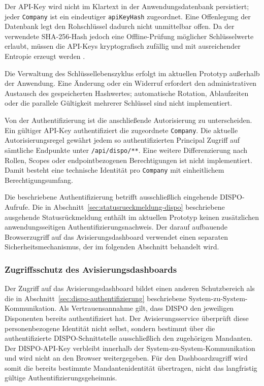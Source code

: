 \documentclass[
  12pt,
  a4paper,
  oneside
]{article}
\begin{document}
Der API-Key wird nicht im Klartext in der Anwendungsdatenbank persistiert;
jeder \texttt{Company} ist ein eindeutiger \texttt{apiKeyHash} zugeordnet. Eine
Offenlegung der Datenbank legt den Rohschlüssel dadurch nicht unmittelbar
offen. Da der verwendete SHA-256-Hash jedoch eine Offline-Prüfung möglicher
Schlüsselwerte erlaubt, müssen die API-Keys kryptografisch zufällig und mit
ausreichender Entropie erzeugt werden
\parencite{owaspSecretsManagement}.

Die Verwaltung des Schlüssellebenszyklus erfolgt im aktuellen Prototyp
außerhalb der Anwendung. Eine Änderung oder ein Widerruf erfordert den
administrativen Austausch des gespeicherten Hashwertes; automatische Rotation,
Ablaufzeiten oder die parallele Gültigkeit mehrerer Schlüssel sind nicht
implementiert.

Von der Authentifizierung ist die anschließende Autorisierung zu unterscheiden.
Ein gültiger API-Key authentifiziert die zugeordnete \texttt{Company}. Die
aktuelle Autorisierungsregel gewährt jedem so authentifizierten Principal
Zugriff auf sämtliche Endpunkte unter \texttt{/api/dispo/**}. Eine weitere
Differenzierung nach Rollen, Scopes oder endpointbezogenen Berechtigungen ist
nicht implementiert. Damit besteht eine technische Identität pro
\texttt{Company} mit einheitlichem Berechtigungsumfang.

Die beschriebene Authentifizierung betrifft ausschließlich eingehende
DISPO-Aufrufe. Die in Abschnitt~\ref{sec:statusrueckmeldung-dispo} beschriebene
ausgehende Statusrückmeldung enthält im aktuellen Prototyp keinen zusätzlichen
anwendungsseitigen Authentifizierungsnachweis. Der darauf aufbauende
Browserzugriff auf das Avisierungsdashboard verwendet einen separaten
Sicherheitsmechanismus, der im folgenden Abschnitt behandelt wird.

\subsubsection{Zugriffsschutz des Avisierungsdashboards}
\label{sec:dashboard-zugriff}

Der Zugriff auf das Avisierungsdashboard bildet einen anderen Schutzbereich
als die in Abschnitt~\ref{sec:dispo-authentifizierung} beschriebene
System-zu-System-Kommunikation. Als Vertrauensannahme gilt, dass DISPO den
jeweiligen Disponenten bereits authentifiziert hat. Der
Avisierungsservice überprüft diese personenbezogene Identität nicht selbst,
sondern bestimmt über die authentifizierte DISPO-Schnittstelle ausschließlich
den zugehörigen Mandanten. Der DISPO-API-Key verbleibt innerhalb der
System-zu-System-Kommunikation und wird nicht an den Browser weitergegeben. Für
den Dashboardzugriff wird somit die bereits bestimmte Mandantenidentität
übertragen, nicht das langfristig gültige Authentifizierungsgeheimnis.
\end{document}
